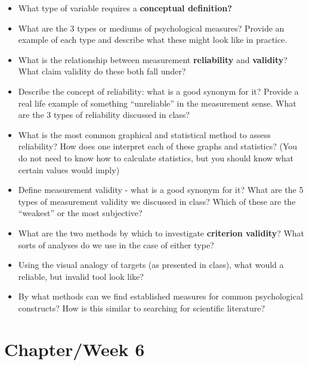 \documentclass[
  12pt,
  letterpaper,
]{scrartcl}
\begin{document}
\begin{itemize}
\item
  What type of variable requires a \textbf{conceptual definition?}
\item
  What are the 3 types or mediums of psychological measures? Provide an
  example of each type and describe what these might look like in
  practice.
\item
  What is the relationship between measurement \textbf{reliability} and
  \textbf{validity}? What claim validity do these both fall under?
\item
  Describe the concept of reliability: what is a good synonym for it?
  Provide a real life example of something ``unreliable'' in the
  measurement sense. What are the 3 types of reliability discussed in
  class?
\item
  What is the most common graphical and statistical method to assess
  reliability? How does one interpret each of these graphs and
  statistics? (You do not need to know how to calculate statistics, but
  you should know what certain values would imply)
\item
  Define measurement validity - what is a good synonym for it? What are
  the 5 types of measurement validity we discussed in class? Which of
  these are the ``weakest'' or the most subjective?
\item
  What are the two methods by which to investigate \textbf{criterion
  validity}? What sorts of analyses do we use in the case of either
  type?
\item
  Using the visual analogy of targets (as presented in class), what
  would a reliable, but invalid tool look like?
\item
  By what methods can we find established measures for common
  psychological constructs? How is this similar to searching for
  scientific literature?
\end{itemize}

\section{Chapter/Week 6}\label{sec-ch-6}
\end{document}
